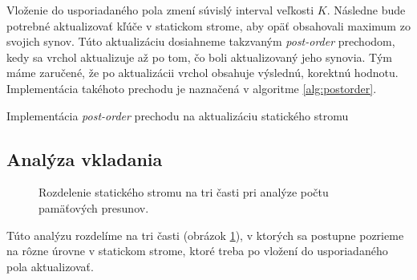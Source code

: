 Vloženie do usporiadaného pola zmení súvislý interval veľkosti $K$. Následne bude potrebné aktualizovať kľúče v statickom strome, aby opäť obsahovali maximum zo svojich synov. Túto aktualizáciu dosiahneme takzvaným \emph{post-order} prechodom, kedy sa vrchol aktualizuje až po tom, čo boli aktualizovaný jeho synovia. Tým máme zaručené, že po aktualizácii vrchol obsahuje výslednú, korektnú hodnotu. Implementácia takéhoto prechodu je naznačená v algoritme \ref{alg:postorder}.

\begin{algorithm}
    \caption{Implementácia \emph{post-order} prechodu na aktualizáciu statického stromu}
    \label{alg:postorder}
    \begin{algorithmic}[1]
         
        \Statex {}
        \Statex
             
                \State \Return {}
            \EndIf
            \Statex
            \Else
                \State {} 
                \State {} 
                \Statex
                 
            \EndIf           
        \EndFunction
    \end{algorithmic}
\end{algorithm}

\subsection{Analýza vkladania}

\begin{figure}
    \centering
    \resizebox{0.9\textwidth}{!}{
        
    }
    \caption{Rozdelenie statického stromu na tri časti pri analýze počtu pamäťových presunov.}
    \label{fig:cobtree_analysis_parts}
\end{figure}

Túto analýzu rozdelíme na tri časti (obrázok \ref{fig:cobtree_analysis_parts}), v ktorých sa postupne pozrieme na rôzne úrovne v statickom strome, ktoré treba po vložení do usporiadaného pola aktualizovať.

